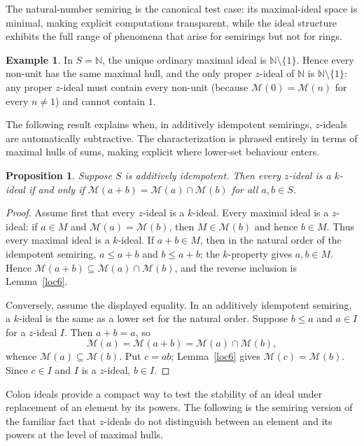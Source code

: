 \documentclass[11pt,leqno]{amsart}
\theoremstyle{plain}
\newtheorem{proposition}[theorem]{Proposition}
\theoremstyle{definition}
\newtheorem{example}[theorem]{Example}
\theoremstyle{remark}
\numberwithin{equation}{section}
\newcommand{\M}{\mathcal M}
\newcommand{\N}{\mathds N}
\begin{document}
The natural-number semiring is the canonical test case:
its maximal-ideal space is minimal, making explicit computations
transparent, while the ideal structure exhibits the full range of
phenomena that arise for semirings but not for rings.

\begin{example}\label{ex:N-zideals}
In $S=\N$, the unique ordinary maximal ideal is $\N\setminus\{1\}$.
Hence every non-unit has the same maximal hull, and the only proper
$z$-ideal of $\N$ is $\N\setminus\{1\}$:
any proper $z$-ideal must contain every non-unit
(because $\M(0)=\M(n)$ for every $n\neq1$) and cannot contain $1$.
\end{example}

The following result explains when, in additively idempotent semirings,
$z$-ideals are automatically subtractive.
The characterization is phrased entirely in terms of maximal hulls
of sums, making explicit where lower-set behaviour enters.

\begin{proposition}\label{prop:idempotent-z-k}
Suppose $S$ is additively idempotent.  Then every $z$-ideal is
a $k$-ideal if and only if $\M(a+b)=\M(a)\cap\M(b)$ for all $a,b\in S$.
\end{proposition}
\begin{proof}
Assume first that every $z$-ideal is a $k$-ideal.
Every maximal ideal is a $z$-ideal: if $a\in M$ and $\M(a)=\M(b)$,
then $M\in\M(b)$ and hence $b\in M$.
Thus every maximal ideal is a $k$-ideal.
If $a+b\in M$, then in the natural order of the idempotent semiring,
$a\leqslant a+b$ and $b\leqslant a+b$;
the $k$-property gives $a,b\in M$.
Hence $\M(a+b)\subseteq\M(a)\cap\M(b)$,
and the reverse inclusion is Lemma~\ref{loc6}.

Conversely, assume the displayed equality.
In an additively idempotent semiring, a $k$-ideal is the same as a
lower set for the natural order.
Suppose $b\leqslant a$ and $a\in I$ for a $z$-ideal $I$.
Then $a+b=a$, so
\[
\M(a)=\M(a+b)=\M(a)\cap\M(b),
\]
whence $\M(a)\subseteq\M(b)$.
Put $c=ab$; Lemma~\ref{loc6} gives $\M(c)=\M(b)$.
Since $c\in I$ and $I$ is a $z$-ideal, $b\in I$.
\end{proof}

Colon ideals provide a compact way to test the stability of an ideal
under replacement of an element by its powers.
The following is the semiring version of the familiar fact that
$z$-ideals do not distinguish between an element and its powers
at the level of maximal hulls.
\end{document}
